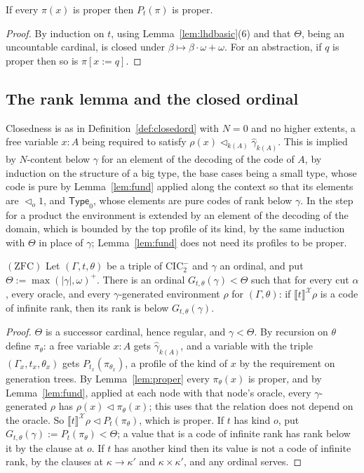 \documentclass[10pt]{article}
\newcommand{\Type}{\mathsf{Type}}
\newcommand{\CIC}{\mathrm{CIC}}
\newcommand{\ZFC}{\mathrm{ZFC}}
\newcommand{\sem}[1]{\llbracket #1\rrbracket}
\newcommand{\X}{\mathcal{X}}
\begin{document}
\begin{lemma}[properness]\label{lem:proper}
If every $\pi(x)$ is proper then $P_t(\pi)$ is proper.
\end{lemma}
\begin{proof}
By induction on $t$, using Lemma~\ref{lem:lhdbasic}(6) and that
$\Theta$, being an uncountable cardinal, is closed under
$\beta\mapsto\beta\cdot\omega+\omega$. For an abstraction, if $q$ is proper
then so is $\pi[x{:=}q]$.
\end{proof}

\subsection{The rank lemma and the closed ordinal}

Closedness is as in Definition~\ref{def:closedord} with $N=0$ and no
higher extents, a free variable $x{:}A$ being required to satisfy
$\rho(x)\lhd_{k(A)}\hat\gamma_{k(A)}$. This is implied by $N$-content below
$\gamma$ for an element of the decoding of the code of $A$, by induction
on the structure of a big type, the base cases being a small type, whose
code is pure by Lemma~\ref{lem:fund} applied along the context so that
its elements are $\lhd_o1$, and $\Type_0$, whose elements are pure codes
of rank below $\gamma$. In the step for a product the environment is
extended by an element of the decoding of the domain, which is bounded
by the top profile of its kind, by the same induction with $\Theta$ in
place of $\gamma$; Lemma~\ref{lem:fund} does not need its profiles to be
proper.

\begin{theorem}[rank lemma for $\CIC_2^-$]\label{thm:rankcic2}
$(\ZFC)$ Let $(\Gamma,t,\theta)$ be a triple of $\CIC_2^-$ and $\gamma$ an
ordinal, and put $\Theta:=\max(|\gamma|,\omega)^+$. There is an ordinal
$G_{t,\theta}(\gamma)<\Theta$ such that for every cut $\alpha$, every oracle,
and every $\gamma$-generated environment $\rho$ for $(\Gamma,\theta)$: if
$\sem t^\X\rho$ is a code of infinite rank, then its rank is below
$G_{t,\theta}(\gamma)$.
\end{theorem}
\begin{proof}
$\Theta$ is a successor cardinal, hence regular, and $\gamma<\Theta$. By
recursion on $\theta$ define $\pi_\theta$: a free variable $x{:}A$ gets
$\hat\gamma_{k(A)}$, and a variable with the triple
$(\Gamma_x,t_x,\theta_x)$ gets $P_{t_x}(\pi_{\theta_x})$, a profile of the
kind of $x$ by the requirement on generation trees. By
Lemma~\ref{lem:proper} every $\pi_\theta(x)$ is proper, and by
Lemma~\ref{lem:fund}, applied at each node with that node's oracle,
every $\gamma$-generated $\rho$ has $\rho(x)\lhd\pi_\theta(x)$; this uses
that the relation does not depend on the oracle. So
$\sem t^\X\rho\lhd P_t(\pi_\theta)$, which is proper. If $t$ has kind $o$,
put $G_{t,\theta}(\gamma):=P_t(\pi_\theta)<\Theta$; a value that is a code
of infinite rank has rank below it by the clause at $o$. If
$t$ has another kind then its value is not a code of infinite rank, by
the clauses at $\kappa\to\kappa'$ and $\kappa\times\kappa'$, and any ordinal
serves.
\end{proof}
\end{document}
